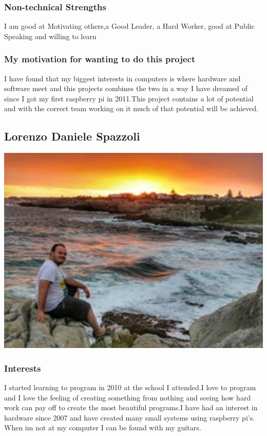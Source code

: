\documentclass[a4paper,12pt]{article}
\begin{document}
	\subsubsection{Non-technical Strengths}
	I am good at Motivating others,a Good Leader, a Hard Worker, good at Public Speaking and willing to learn  			
	\subsubsection{My motivation for wanting to do this project}
	I have found that my biggest interests in computers is where hardware and software meet and this projects combines the two in a way I have dreamed of since I got my first raspberry pi in 2011.This project contains a lot of potential and with the correct team working on it much of that potential will be achieved.
		\newpage
		\subsection{Lorenzo Daniele Spazzoli}
		\includegraphics[width=1\textwidth]{./Pictures/lorenzo.jpg}\\
			\subsubsection{Interests}
			I started learning to program in 2010 at the school I attended.I love to program and I love the feeling of creating something from nothing and seeing how hard work can pay off to create the most beautiful programs.I have had an interest in hardware since 2007 and have created many small systems using raspberry pi's. When im not at my computer I can be found with my guitars.  
\end{document}
